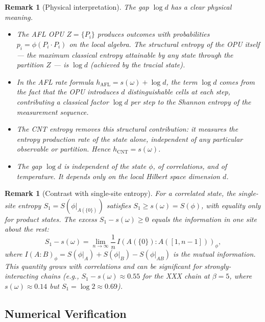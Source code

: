 \documentclass[12pt,a4paper]{article}
\newtheorem{remark}[theorem]{Remark}
\begin{document}
\begin{remark}[Physical interpretation]\label{rmk:gap_interpretation}
The gap $\log d$ has a clear physical meaning.
\begin{itemize}
\item The AFL OPU $Z=\{P_i\}$ produces outcomes with probabilities $p_i=\phi(P_i\cdot P_i)$
  on the local algebra.  The \emph{structural entropy} of the OPU itself --- the
  maximum classical entropy attainable by any state through the partition $Z$ ---
  is $\log d$ (achieved by the tracial state).
\item In the AFL rate formula $h_\mathrm{AFL}=s(\omega)+\log d$, the term $\log d$
  comes from the fact that the OPU introduces $d$ distinguishable cells at each step,
  contributing a classical factor $\log d$ per step to the Shannon entropy of the
  measurement sequence.
\item The CNT entropy removes this structural contribution: it measures the entropy
  production rate \emph{of the state alone}, independent of any particular observable
  or partition.  Hence $h_\mathrm{CNT}=s(\omega)$.
\item The gap $\log d$ is \emph{independent} of the state $\phi$, of correlations,
  and of temperature.  It depends only on the local Hilbert space dimension $d$.
\end{itemize}
\end{remark}

\begin{remark}[Contrast with single-site entropy]\label{rmk:s1_vs_s_phi}
For a correlated state, the single-site entropy $S_1=S(\phi|_{A(\{0\})})$ satisfies
$S_1 \ge s(\omega) = S(\phi)$, with equality only for product states.
The excess $S_1-s(\omega)\ge 0$ equals the \emph{information in one site about the rest}:
\begin{equation}\label{eq:mutual_excess}
  S_1 - s(\omega)
  = \lim_{n\to\infty}\frac{1}{n}\,I(A(\{0\}) : A([1,n-1]))_\phi,
\end{equation}
where $I(A:B)_\phi = S(\phi|_A)+S(\phi|_B)-S(\phi|_{AB})$ is the mutual information.
This quantity grows with correlations and can be significant for strongly-interacting
chains (e.g., $S_1-s(\omega)\approx 0.55$ for the XXX chain at $\beta=5$,
where $s(\omega)\approx 0.14$ but $S_1=\log 2\approx 0.69$).
\end{remark}

\subsection{Numerical Verification}
\end{document}
